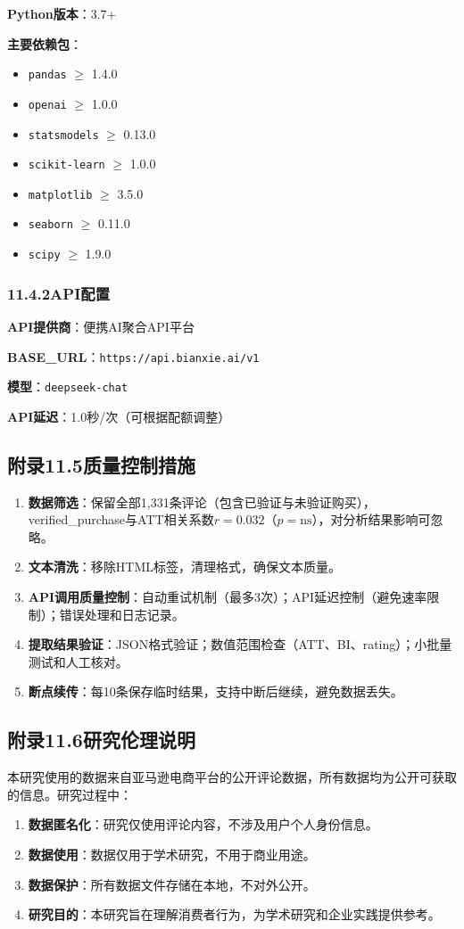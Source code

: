 \textbf{Python版本}：3.7+

\textbf{主要依赖包}：
\begin{itemize}
  \item \texttt{pandas} $\geq$ 1.4.0
  \item \texttt{openai} $\geq$ 1.0.0
  \item \texttt{statsmodels} $\geq$ 0.13.0
  \item \texttt{scikit-learn} $\geq$ 1.0.0
  \item \texttt{matplotlib} $\geq$ 3.5.0
  \item \texttt{seaborn} $\geq$ 0.11.0
  \item \texttt{scipy} $\geq$ 1.9.0
\end{itemize}

\subsubsection*{11.4.2\quad API配置}

\textbf{API提供商}：便携AI聚合API平台

\textbf{BASE\_URL}：\texttt{https://api.bianxie.ai/v1}

\textbf{模型}：\texttt{deepseek-chat}

\textbf{API延迟}：1.0秒/次（可根据配额调整）

\subsection*{附录11.5\quad 质量控制措施}

\begin{enumerate}
  \item \textbf{数据筛选}：保留全部1{,}331条评论（包含已验证与未验证购买），verified\_purchase与ATT相关系数$r=0.032$（$p=\text{ns}$），对分析结果影响可忽略。
  \item \textbf{文本清洗}：移除HTML标签，清理格式，确保文本质量。
  \item \textbf{API调用质量控制}：自动重试机制（最多3次）；API延迟控制（避免速率限制）；错误处理和日志记录。
  \item \textbf{提取结果验证}：JSON格式验证；数值范围检查（ATT、BI、rating）；小批量测试和人工核对。
  \item \textbf{断点续传}：每10条保存临时结果，支持中断后继续，避免数据丢失。
\end{enumerate}

\subsection*{附录11.6\quad 研究伦理说明}

本研究使用的数据来自亚马逊电商平台的公开评论数据，所有数据均为公开可获取的信息。研究过程中：

\begin{enumerate}
  \item \textbf{数据匿名化}：研究仅使用评论内容，不涉及用户个人身份信息。
  \item \textbf{数据使用}：数据仅用于学术研究，不用于商业用途。
  \item \textbf{数据保护}：所有数据文件存储在本地，不对外公开。
  \item \textbf{研究目的}：本研究旨在理解消费者行为，为学术研究和企业实践提供参考。
\end{enumerate}
